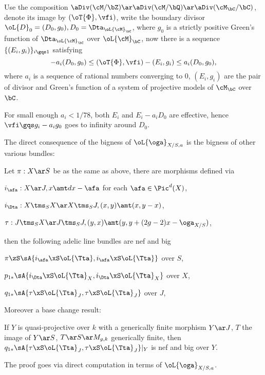 \documentclass[article, a4paper, twoside]{universal}
\begin{document}
\begin{prf}
	Use the composition $\aDiv(\cM/\bZ)\ar\aDiv(\cM/\bQ)\ar\aDiv(\cM_{\bC}/\bC)$, denote its image by $(\oT{\Phi},\vfi)$, write the boundary divisor $\oL{D}_{0}=(D_{0},g_{0}), D_{0}=\Dta_{\oL{\cM}_{\bC}}$, where $g_{0}$ is a strictly positive Green's function of $\Dta_{\oL{\cM}_{\bC}}$ over $\oL{\cM}_{\bC}$, now there is a sequence $\{(E_{i},g_{i})\}_{i\gqs1}$ satisfying
	\[
		-a_{i}(D_{0},g_{0})\leq(\oT{\Phi},\vfi)-(E_{i},g_{i})\leq a_{i}(D_{0},g_{0}),
	\]
	where $a_{i}$ is a sequence of rational numbers converging to $0$, $(E_{i},g_{i})$ are the pair of divisor and Green's function of a system of projective models of $\cM_{\bC}$ over $\bC$.

	For small enough $a_{i}<1/78$, both $E_{i}$ and $E_{i}-a_{i}D_{0}$ are effective, hence $\vfi\gqs g_{i}-a_{i}g_{0}$ goes to infinity around $D_{0}$.
\end{prf}


The direct consequence of the bigness of $\oL{\oga}_{X/S,a}$ is the bigness of other various bundles:

\begin{thm}
	Let $\pi:X\ar S$ be as the same as above, there are morphisms defined via
	\begin{enr}
		\item $i_{\afa}:X\ar J, x\amt dx-\afa$ for each $\afa\in\Pic^{d}(X)$,
		\item $i_{\Dta}:X\tms_{S}X\ar X\tms_{S}J, (x,y)\amt (x,y-x)$,
		\item $\tau:J\tms_{S}X\ar J\tms_{S}J, (y,x)\amt(y,y+(2g-2)x-\oga_{X/S})$,
	\end{enr}
	then the following adelic line bundles are nef and big
	\begin{enr}
		\item $\pi\zS\sA{i_{\afa}\xS\oL{\Tta},i_{\afa}\xS\oL{\Tta}}$ over $S$,
		\item $p_{1*}\sA{i_{\Dta}\xS\oL{\Tta}_{X},i_{\Dta}\xS\oL{\Tta}_{X}}$ over $X$,
		\item $q_{1*}\sA{\tau\xS\oL{\Tta}_{J},\tau\xS\oL{\Tta}_{J}}$ over $J$,
	\end{enr}
	Moreover a base change result:

	If $Y$ is quasi-projective over $k$ with a generically finite morphism $Y\ar J$, $T$ the image of $Y\ar S$, $T\ar S\ar M_{g,k}$ generically finite, then $q_{1*}\sA{\tau\xS\oL{\Tta}_{J},\tau\xS\oL{\Tta}_{J}}|_{Y}$ is nef and big over $Y$.
\end{thm}
\begin{rmk}
	The proof goes via direct computation in terms of $\oL{\oga}_{X/S,a}$.
\end{rmk}
\end{document}
